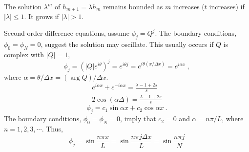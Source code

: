 \documentclass[12pt,a4paper]{article}
\begin{document}
The solution $\lambda^m$ of $h_{m+1}=\lambda h_m$ remains bounded as $m$ increases ($t$ increases) if $|\lambda|
\leqslant 1$. It grows if $|\lambda| > 1$.

Second-order difference equations, assume $\phi_j = Q^j$. The boundary conditions, $\phi_0=\phi_N=0$, suggest the solution may oscillate. This usually occurs if $Q$ is complex with $|Q|=1$,
\begin{equation}
\phi_j = (|Q| e^{i\theta})^j = e^{i\theta j} = e^{i\theta (x/\Delta x)} = e^{i\alpha x} ~,
\end{equation}
where $\alpha = \theta/\Delta x = (\arg Q)/\Delta x$. 
\begin{align*}
e^{i\alpha x} +e^{-i\alpha x} = \frac{\lambda -1+2s}{s}  \\
2\cos (\alpha \Delta) = \frac{\lambda -1+2s}{s} 
\end{align*}
\begin{equation}
\phi_j = c_1 \sin \alpha x +c_2 \cos \alpha x ~.
\end{equation}
The boundary conditions, $\phi_0=\phi_N=0$, imply that $c_2=0$ and $\alpha=n\pi/L$, where $n=1,2,3,\cdots$. Thus,
\begin{equation}
\phi_j = \sin \frac{n\pi x}{L} = \sin \frac{n\pi j \Delta x}{L} = \sin \frac{n\pi j}{N} 
\end{equation}
\end{document}
